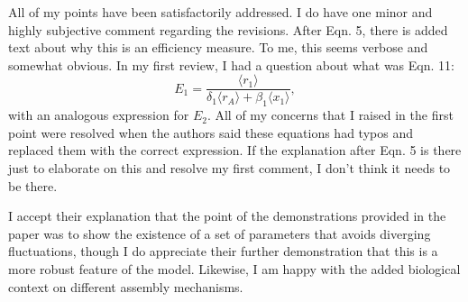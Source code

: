 \documentclass[12pt,oneside,letterpaper]{article}
\begin{document}
	All of my points have been satisfactorily addressed. I do have one minor and highly subjective comment regarding the revisions. After Eqn. 5, there is added text about why this is an efficiency measure. To me, this seems verbose and somewhat obvious. In my first review, I had a question about what was Eqn. 11:
	\begin{equation*}
		E_1 = \frac{\langle r_1 \rangle}{\delta_1 \langle r_A\rangle + \beta_1 \langle x_1 \rangle},
	\end{equation*}
	with an analogous expression for $E_2$. All of my concerns that I raised in the first point were resolved when the authors said these equations had typos and replaced them with the correct expression. If the explanation after Eqn. 5 is there just to elaborate on this and resolve my first comment, I don't think it needs to be there.
	
	I accept their explanation that the point of the demonstrations provided in the paper was to show the existence of a set of parameters that avoids diverging fluctuations, though I do appreciate their further demonstration that this is a more robust feature of the model. Likewise, I am happy with the added biological context on different assembly mechanisms.
\end{document}
